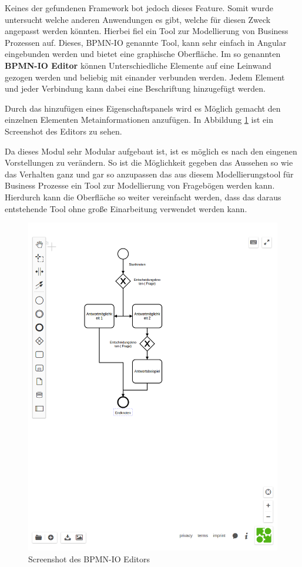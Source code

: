 Keines der gefundenen Framework bot jedoch dieses Feature. Somit wurde untersucht welche anderen Anwendungen es gibt, welche für diesen Zweck angepasst werden könnten. Hierbei fiel ein Tool zur Modellierung von Business Prozessen auf. Dieses, BPMN-IO \cite{BPMNIO16} genannte Tool, kann sehr einfach in Angular eingebunden werden und bietet eine graphische Oberfläche. Im so genannten \textbf{BPMN-IO Editor} können Unterschiedliche Elemente auf eine Leinwand gezogen werden und beliebig mit einander verbunden werden. Jedem Element und jeder Verbindung kann dabei eine Beschriftung hinzugefügt werden. 

Durch das hinzufügen eines Eigenschaftspanels wird es Möglich gemacht den einzelnen Elementen Metainformationen anzufügen. In Abbildung \ref{BPMNEditorBSP} ist ein Screenshot des Editors zu sehen.

Da dieses Modul sehr Modular aufgebaut ist, ist es möglich es nach den eingenen Vorstellungen zu verändern. So ist die Möglichkeit gegeben das Aussehen so wie das  Verhalten ganz und gar so anzupassen das aus diesem Modellierungstool für Business Prozesse ein Tool zur Modellierung von Fragebögen werden kann. Hierdurch kann die Oberfläche so weiter vereinfacht werden, dass das daraus entstehende Tool ohne große Einarbeitung verwendet werden kann.

\begin{figure}[H]
	\centering
	\includegraphics[scale=0.5]{images/BPMNEditorBSP}
	\caption[Screenshot des BPMN-IO Editors]{Screenshot des BPMN-IO Editors}
	\label{BPMNEditorBSP}
\end{figure}



